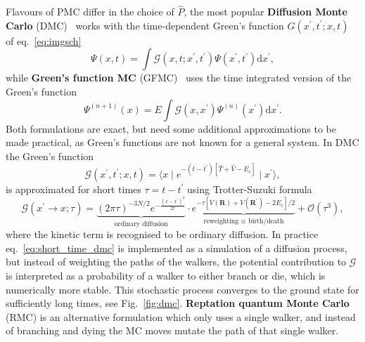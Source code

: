 Flavours of PMC differ in the choice of $\hat{P}$, the most popular \textbf{Diffusion Monte Carlo} (DMC)~\cite{foulkes2001quantum, reynolds1990diffusion} works with the time-dependent Green's function $G(x^\prime, t^\prime; x, t)$ of eq.~\eqref{eq:imgsch}
\begin{equation}
	\Psi(x, t)=\int \mathcal G\left(x, t; x^\prime, t^\prime\right) \Psi \left(x^{\prime}, t^\prime \right) \mathrm{d} x^{\prime},
\end{equation}
while\textbf{ Green's function MC} (GFMC)~\cite{kalos1962monte, kalos1966stochastic} uses the time integrated version of the Green's function
\begin{equation}
	\Psi^{(n+1)}(x)=E \int \mathcal G\left(x, x^{\prime}\right) \Psi^{(n)}\left(x^{\prime}\right) \mathrm{d}x^\prime. 
\end{equation}
Both formulations are exact, but need some additional approximations to be made practical, as Green's functions are not known for a general system. In DMC the Green's function
\begin{equation}
	\mathcal G(x^\prime, t^\prime; x, t) = \langle x \mid e^{-(t-t^\prime) [\hat T + \hat V - E_c ] } \mid x^\prime \rangle,
\end{equation}
is approximated for short times $\tau = t-t^\prime$ using Trotter-Suzuki formula
\begin{equation}
	\label{eq:short_time_dmc}
	\mathcal G(x^\prime \rightarrow x; \tau) = \underbrace{(2 \pi \tau)^{-3N / 2} e^{-\frac{\left(x-x^{\prime}\right)^{2}}{2 \tau}}}_{\text{ordinary diffusion}} \cdot \underbrace{e^{-\tau\left[V(\mathbf{R})+V\left(\mathbf{R}^{\prime}\right)-2 E_{c}\right] / 2}}_{\text{reweighting $\equiv$ birth/death}} + \mathcal{O}(\tau^3),
\end{equation}
where the kinetic term is recognised to be ordinary diffusion. In practice eq.~\eqref{eq:short_time_dmc} is implemented as a simulation of a diffusion process, but instead of weighting the paths of the walkers, the potential contribution to $\mathcal G$ is interpreted as a probability of a walker to either branch or die, which is numerically more stable. This stochastic process converges to the ground state for sufficiently long times, see Fig.~\ref{fig:dmc}. \textbf{Reptation quantum Monte Carlo}~\cite{reynolds1990diffusion} (RMC) is an alternative formulation which only uses a single walker, and instead of branching and dying the MC moves mutate the path of that single walker. 
